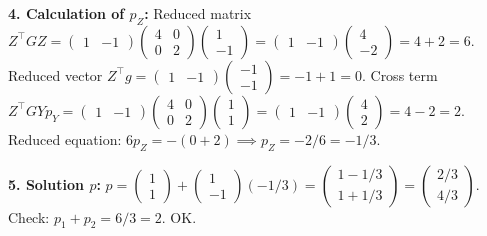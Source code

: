 \begin{correction}
\textbf{4. Calculation of $p_Z$:}
Reduced matrix $Z^\top G Z = \begin{pmatrix} 1 & -1 \end{pmatrix} \begin{pmatrix} 4 & 0 \\ 0 & 2 \end{pmatrix} \begin{pmatrix} 1 \\ -1 \end{pmatrix} = \begin{pmatrix} 1 & -1 \end{pmatrix} \begin{pmatrix} 4 \\ -2 \end{pmatrix} = 4 + 2 = 6$.
Reduced vector $Z^\top g = \begin{pmatrix} 1 & -1 \end{pmatrix} \begin{pmatrix} -1 \\ -1 \end{pmatrix} = -1 + 1 = 0$.
Cross term $Z^\top G Y p_Y = \begin{pmatrix} 1 & -1 \end{pmatrix} \begin{pmatrix} 4 & 0 \\ 0 & 2 \end{pmatrix} \begin{pmatrix} 1 \\ 1 \end{pmatrix} = \begin{pmatrix} 1 & -1 \end{pmatrix} \begin{pmatrix} 4 \\ 2 \end{pmatrix} = 4 - 2 = 2$.
Reduced equation: $6 p_Z = -(0 + 2) \implies p_Z = -2/6 = -1/3$.

\textbf{5. Solution $p$:}
$p = \begin{pmatrix} 1 \\ 1 \end{pmatrix} + \begin{pmatrix} 1 \\ -1 \end{pmatrix} (-1/3) = \begin{pmatrix} 1 - 1/3 \\ 1 + 1/3 \end{pmatrix} = \begin{pmatrix} 2/3 \\ 4/3 \end{pmatrix}$.
Check: $p_1 + p_2 = 6/3 = 2$. OK.
\end{correction}
\bigskip

